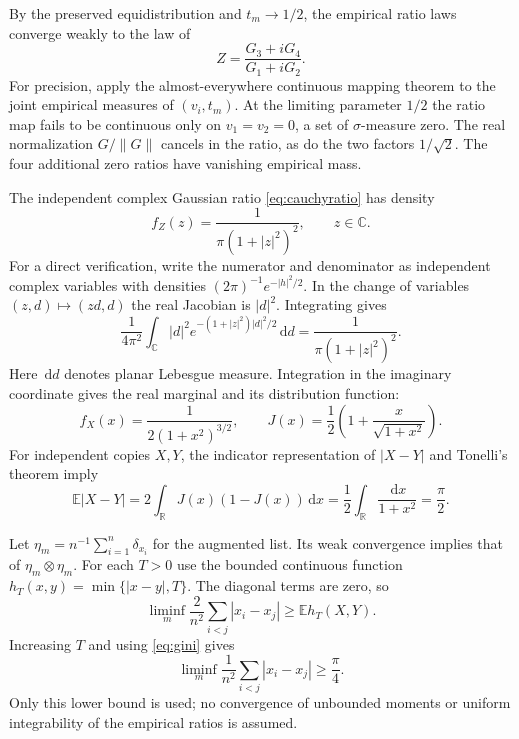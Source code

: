 \documentclass[11pt]{article}
\theoremstyle{remark}
\newcommand{\R}{\mathbb R}
\newcommand{\C}{\mathbb C}
\newcommand{\E}{\mathbb E}
\newcommand{\dd}{\,\mathrm d}
\begin{document}
By the preserved equidistribution and $t_m\to1/2$, the empirical ratio laws converge weakly to the law of
\begin{equation}\label{eq:cauchyratio}
 Z=\frac{G_3+iG_4}{G_1+iG_2}.
\end{equation}
For precision, apply the almost-everywhere continuous mapping theorem to the joint empirical measures of $(v_i,t_m)$. At the limiting parameter $1/2$ the ratio map fails to be continuous only on $v_1=v_2=0$, a set of $\sigma$-measure zero. The real normalization $G/\|G\|$ cancels in the ratio, as do the two factors $1/\sqrt2$. The four additional zero ratios have vanishing empirical mass.

The independent complex Gaussian ratio \eqref{eq:cauchyratio} has density
\begin{equation}\label{eq:cauchydensity}
 f_Z(z)=\frac{1}{\pi(1+|z|^2)^2},\qquad z\in\C.
\end{equation}
For a direct verification, write the numerator and denominator as independent complex variables with densities $(2\pi)^{-1}e^{-|h|^2/2}$. In the change of variables $(z,d)\mapsto(zd,d)$ the real Jacobian is $|d|^2$. Integrating gives
\[
 \frac{1}{4\pi^2}\int_{\C}|d|^2e^{-(1+|z|^2)|d|^2/2}\dd d
       =\frac{1}{\pi(1+|z|^2)^2}.
\]
Here $\dd d$ denotes planar Lebesgue measure. Integration in the imaginary coordinate gives the real marginal and its distribution function:
\begin{equation}\label{eq:marginal}
 f_X(x)=\frac{1}{2(1+x^2)^{3/2}},\qquad
 J(x)=\frac12\left(1+\frac{x}{\sqrt{1+x^2}}\right).
\end{equation}
For independent copies $X,Y$, the indicator representation of $|X-Y|$ and Tonelli's theorem imply
\begin{equation}\label{eq:gini}
 \E|X-Y|=2\int_{\R}J(x)(1-J(x))\dd x
        =\frac12\int_{\R}\frac{\dd x}{1+x^2}=\frac\pi2.
\end{equation}

Let $\eta_m=n^{-1}\sum_{i=1}^n\delta_{x_i}$ for the augmented list. Its weak convergence implies that of $\eta_m\otimes\eta_m$. For each $T>0$ use the bounded continuous function $h_T(x,y)=\min\{|x-y|,T\}$. The diagonal terms are zero, so
\[
 \liminf_m\frac{2}{n^2}\sum_{i<j}|x_i-x_j|
       \geq\E h_T(X,Y).
\]
Increasing $T$ and using \eqref{eq:gini} gives
\begin{equation}\label{eq:score}
 \liminf_m\frac1{n^2}\sum_{i<j}|x_i-x_j|\geq\frac\pi4.
\end{equation}
Only this lower bound is used; no convergence of unbounded moments or uniform integrability of the empirical ratios is assumed.
\end{document}
